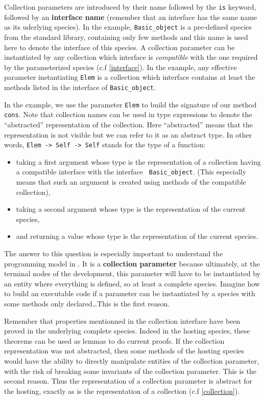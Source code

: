 Collection parameters are introduced by their name followed by the
{\tt is} keyword, followed by an {\bf interface name} (remember that
an interface has the same name as its uderlying species). In the
example, {\tt Basic\_object} is a pre-defined species  from the
standard library, containing only few methods and this name is used
here to denote the interface of this species.   A
collection parameter can be instantiated by any collection which
interface is {\em
  compatible} with the one required by
the parameterized species (c.f \ref{interface}). In the example, any
effective parameter instantiating {\tt Elem} is a collection which
interface contains at least the methods  listed in the interface of
{\tt Basic\_object}. 

\smallskip
In the example, we use the parameter {\tt Elem} to build the signature
of our method {\tt cons}. Note that collection names can be used
in type expressions to denote the ``abstracted'' representation of the
collection. Here ``abstracted'' means that the
representation is not visible but we can refer to it
as an abstract type. In other words, {\tt Elem -> Self -> Self}
stands for the type of a function:
\begin{itemize}
\item taking a first argument whose type is the representation  of a
  collection having a compatible interface with the interface {\tt
    Basic\_object}. (This especially means that such an argument is created using methods of the compatible collection),
  \item taking a second argument whose type is the representation of the current
    species,
  \item and returning a value whose type is the representation  of the
    current species.
\end{itemize}


The answer to this question is especially important to
understand the programming model in \focal. It is a {\bf collection
  parameter} because ultimately, at the terminal nodes of the
development, this parameter will have to be instantiated by an entity
where everything is defined, so at least a complete species.   Imagine how to
build an executable code if a parameter can be instantiated by a
species with some methods only declared\ldots This is the first
reason. 
 
Remember that properties mentionned in the collection interface have
been proved in the underlying complete species. Indeed in the hosting
species, these theorems can be used as lemmas to do current proofs. If
the collection representation was not abstracted, then some methods of
the hosting species would have the ability to directly manipulate
entities of the collection parameter, with the risk of breaking some
invariants of the collection parameter.  This is the second reason.
Thus the representation of a collection parameter is abstract for the
hosting, exactly as is the representation of a collection (c.f
\ref{collection}).

